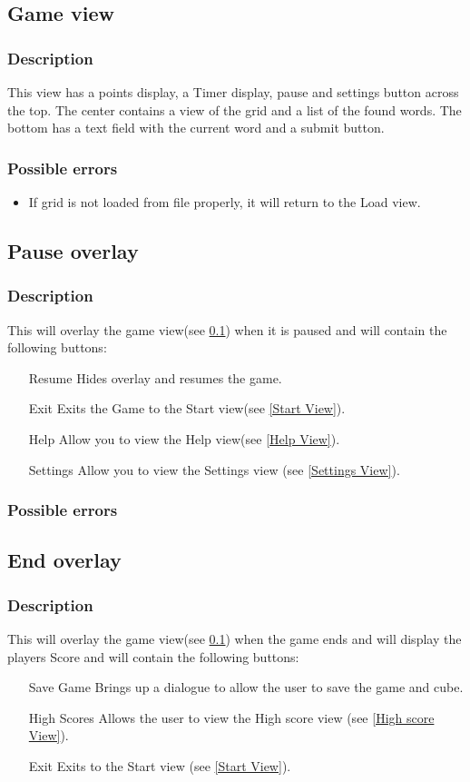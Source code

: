 \documentclass{project}
\begin{document}
\subsection{Game view} \label{Game View}
\subsubsection{Description}
This view has a points display, a Timer display, pause and settings button across the top. The center contains a view of the grid and a list of the found words. The bottom has a text field with the current word and a submit button.
\subsubsection{Possible errors}
\begin{itemize}
\item If grid is not loaded from file properly, it will return to the Load view.
\end{itemize}

\subsection{Pause overlay} \label{Pause Overlay}
\subsubsection{Description}
This will overlay the game view(see \ref{Game View}) when it is paused and will contain the following buttons:
\begin{itemize}
\item[Resume]Hides overlay and resumes the game.
\item[Exit] Exits the Game to the Start view(see \ref{Start View}).
\item[Help] Allow you to view the Help view(see \ref{Help View}).
\item[Settings] Allow you to view the Settings view (see \ref{Settings View}).
\end{itemize}
\subsubsection{Possible errors}


\subsection{End overlay} \label{End Overlay}
\subsubsection{Description}
This will overlay the game view(see \ref{Game View}) when the game ends and will display the players Score and will contain the following buttons:
\begin{itemize}
\item[Save Game] Brings up a dialogue to allow the user to save the game and cube.
\item[High Scores] Allows the user to view the High score view (see \ref{High score View}).
\item[Exit] Exits to the Start view (see \ref{Start View}).
\end{itemize}
\end{document}
